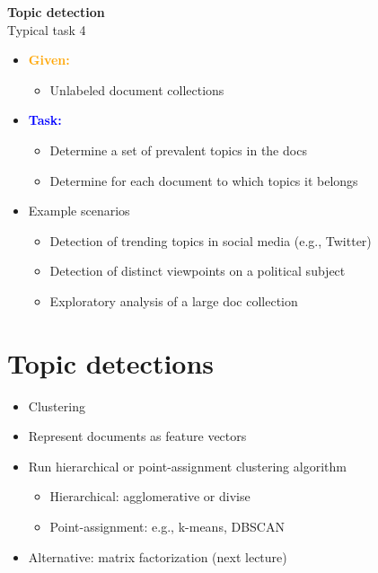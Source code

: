 \documentclass[11pt]{article}
\begin{document}
\vspace{0.5cm}

\begin{center}
  {\LARGE \textbf{Topic detection}} \\
  Typical task 4
\end{center}
\vspace{0.5cm}
\begin{itemize}
	\item \textcolor{orange}{\textbf{Given:}}
		\begin{itemize}
			\item Unlabeled document collections
		\end{itemize}
	\item \textbf{\textcolor{blue}{Task:}}
		\begin{itemize}
			\item Determine a set of prevalent topics in the docs
			\item Determine for each document to which topics it belongs
		\end{itemize}
	\item Example scenarios
		\begin{itemize}
			\item Detection of trending topics in social media (e.g., Twitter)
			\item Detection of distinct viewpoints on a political subject
			\item Exploratory analysis of a large doc collection
		\end{itemize}	
\end{itemize}

\section*{Topic detections}
\begin{itemize}
	\item Clustering
	\item Represent documents as feature vectors
	\item Run hierarchical or point-assignment clustering algorithm
		\begin{itemize}
			\item Hierarchical: agglomerative or divise
			\item Point-assignment: e.g., k-means, DBSCAN
		\end{itemize}
	\item Alternative: matrix factorization (next lecture)
\end{itemize}
\end{document}
